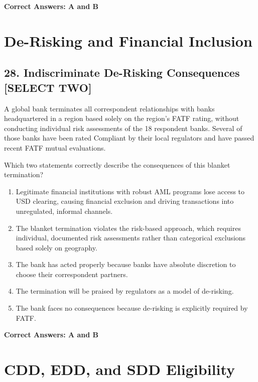 \documentclass[11pt,a4paper]{article}
\begin{document}
	\textbf{Correct Answers: A and B}
	
	\section{De-Risking and Financial Inclusion}
	
	\subsection{28. Indiscriminate De-Risking Consequences \textnormal{[SELECT TWO]}}
	
	A global bank terminates all correspondent relationships with banks headquartered in a region based solely on the region's FATF rating, without conducting individual risk assessments of the 18 respondent banks. Several of those banks have been rated Compliant by their local regulators and have passed recent FATF mutual evaluations.
	
	Which two statements correctly describe the consequences of this blanket termination?
	
	\begin{enumerate}[label=\Alph*.]
		\item Legitimate financial institutions with robust AML programs lose access to USD clearing, causing financial exclusion and driving transactions into unregulated, informal channels.
		\item The blanket termination violates the risk-based approach, which requires individual, documented risk assessments rather than categorical exclusions based solely on geography.
		\item The bank has acted properly because banks have absolute discretion to choose their correspondent partners.
		\item The termination will be praised by regulators as a model of de-risking.
		\item The bank faces no consequences because de-risking is explicitly required by FATF.
	\end{enumerate}
	
	\textbf{Correct Answers: A and B}
	
	\section{CDD, EDD, and SDD Eligibility}
	
\end{document}
